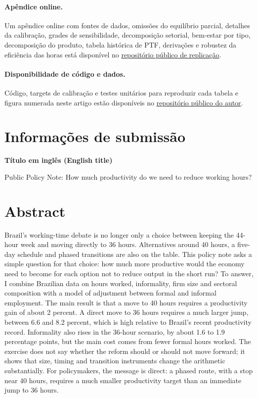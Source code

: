 \documentclass[10pt,twocolumn]{article}
\newcommand{\onlineappendixurl}{https://github.com/vr-rodrigues/jornada-6x1-replication}
\begin{document}
\FloatBarrier

\paragraph{Ap\^endice online.} Um ap\^endice online com fontes de dados, omiss\~oes do equil\'ibrio parcial, detalhes da calibra\c{c}\~ao, grades de sensibilidade, decomposi\c{c}\~ao setorial, bem-estar por tipo, decomposi\c{c}\~ao do produto, tabela hist\'orica de PTF, deriva\c{c}\~oes e robustez da efici\^encia das horas est\'a dispon\'ivel no \href{\onlineappendixurl}{reposit\'orio p\'ublico de replica\c{c}\~ao}.

\paragraph{Disponibilidade de c\'odigo e dados.} C\'odigo, targets de calibra\c{c}\~ao e testes unit\'arios para reproduzir cada tabela e figura numerada neste artigo est\~ao dispon\'iveis no \href{https://github.com/vr-rodrigues/jornada-6x1-replication}{reposit\'orio p\'ublico do autor}.




\clearpage
\onecolumn
\section*{Informa\c{c}\~oes de submiss\~ao}
\setlength{\parindent}{0pt}
\setlength{\parskip}{4pt}

\textbf{T\'itulo em ingl\^es (English title)}

Public Policy Note: How much productivity do we need to reduce working hours?

\section*{Abstract}

Brazil's working-time debate is no longer only a choice between keeping the 44-hour week and moving directly to 36 hours. Alternatives around 40 hours, a five-day schedule and phased transitions are also on the table. This policy note asks a simple question for that choice: how much more productive would the economy need to become for each option not to reduce output in the short run? To answer, I combine Brazilian data on hours worked, informality, firm size and sectoral composition with a model of adjustment between formal and informal employment. The main result is that a move to 40 hours requires a productivity gain of about 2 percent. A direct move to 36 hours requires a much larger jump, between 6.6 and 8.2 percent, which is high relative to Brazil's recent productivity record. Informality also rises in the 36-hour scenario, by about 1.6 to 1.9 percentage points, but the main cost comes from fewer formal hours worked. The exercise does not say whether the reform should or should not move forward; it shows that size, timing and transition instruments change the arithmetic substantially. For policymakers, the message is direct: a phased route, with a stop near 40 hours, requires a much smaller productivity target than an immediate jump to 36 hours.
\end{document}
